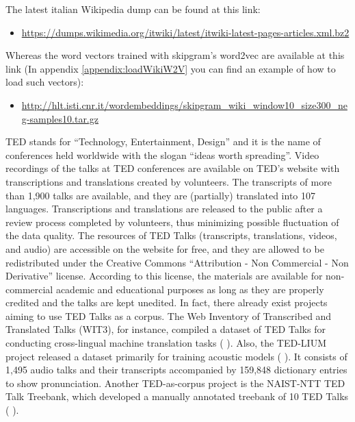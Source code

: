 The latest italian Wikipedia dump can be found at this link:
\begin{itemize}
	\item \url{https://dumps.wikimedia.org/itwiki/latest/itwiki-latest-pages-articles.xml.bz2}
\end{itemize}
Whereas the word vectors trained with skipgram's word2vec are available at this link (In appendix \ref{appendix:loadWikiW2V} you can find an example of how to load such vectors):
\begin{itemize}
	\item \url{http://hlt.isti.cnr.it/wordembeddings/skipgram_wiki_window10_size300_neg-samples10.tar.gz}
\end{itemize}



TED stands for “Technology, Entertainment, Design” and it is the name of conferences held worldwide with the slogan “ideas worth spreading”. Video recordings of the talks at TED conferences are available on TED’s website with transcriptions and translations created by volunteers. The transcripts of more than 1,900 talks are available, and they are (partially) translated into 107 languages. Transcriptions and translations are released to the public after a review process completed by volunteers, thus minimizing possible fluctuation of the data quality.
The resources of TED Talks (transcripts, translations, videos, and audio) are accessible on the website for free, and they are allowed to be redistributed under the Creative Commons “Attribution - Non Commercial - Non Derivative” license. According to this license, the materials are available for non-commercial academic and
educational purposes as long as they are properly credited and the talks are kept unedited.
In fact, there already exist projects aiming to use TED Talks as a corpus. The Web Inventory of Transcribed and Translated Talks (WIT3), for instance, compiled a dataset of TED Talks for conducting cross-lingual machine translation tasks (\citeauthor{mauro2012wit3} \citeyear{mauro2012wit3} \cite{mauro2012wit3}). Also, the TED-LIUM project released a dataset primarily for training acoustic models (\citeauthor{rousseau2014enhancing} \citeyear{rousseau2014enhancing} \cite{rousseau2014enhancing}). It consists of 1,495 audio talks and their transcripts accompanied by 159,848 dictionary entries to show pronunciation. Another TED-as-corpus project is the NAIST-NTT TED Talk Treebank, which developed a manually annotated treebank of 10 TED Talks (\citeauthor{neubig2014naist} \citeyear{neubig2014naist} \cite{neubig2014naist}).


